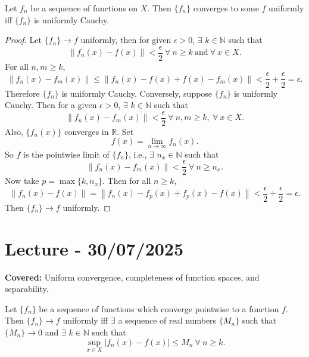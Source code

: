 \documentclass{functionspaces}
\begin{document}
\begin{proposition}
Let $f_{n}$ be a sequence of functions on $X$. Then $\{f_{n}\}$ converges to some $f$ uniformly iff $\{f_{n}\}$ is uniformly Cauchy.
\end{proposition}

\begin{proof}
Let $\{f_{n}\}\to f$ uniformly, then for given $\epsilon>0$, $\exists$ $k \in \mathbb{N}$ such that
\[
\|f_{n}(x)-f(x)\|<\frac{\epsilon}{2}\ \forall\ n \geq k\ \text{and}\ \forall\ x \in X.
\]
For all $n,m \geq k$,
\[
\|f_{n}(x)-f_{m}(x)\|\leq \|f_{n}(x)-f(x)+f(x)-f_{m}(x)\|<\frac{\epsilon}{2}+\frac{\epsilon}{2}=\epsilon.
\]
Therefore $\{f_{n}\}$ is uniformly Cauchy. Conversely, suppose $\{f_{n}\}$ is uniformly Cauchy. Then for a given $\epsilon>0$, $\exists$ $k \in \mathbb{N}$ such that
\[
\|f_{n}(x)-f_{m}(x)\|<\frac{\epsilon}{2}\ \forall\ n,m \geq k,\ \forall\ x \in X.
\]
Also, $\{f_{n}(x)\}$ converges in $\mathbb{R}$. Set
\[
f(x)=\lim_{n\to \infty}f_{n}(x).
\]
So $f$ is the pointwise limit of $\{f_{n}\}$, i.e., $\exists$ $n_{x} \in \mathbb{N}$ such that
\[
\|f_{n}(x)-f_{m}(x)\|<\frac{\epsilon}{2}\ \forall\ n \geq n_{x}.
\]
Now take $p=\max\{k,n_{x}\}$. Then for all $n \geq k$,
\[
\|f_{n}(x)-f(x)\|=\left\|f_{n}(x)-f_{p}(x)+f_{p}(x)-f(x)\right\|<\frac{\epsilon}{2}+\frac{\epsilon}{2}=\epsilon.
\]
Then $\{f_{n}\}\to f$ uniformly.
\end{proof}

\endgroup


\newpage
\section{Lecture - 30/07/2025}

\textbf{Covered:} Uniform convergence, completeness of function spaces, and separability.

\begingroup
\setlength{\parskip}{6pt}
\setlength{\parindent}{0pt}

\begin{proposition}
Let $\{f_{n}\}$ be a sequence of functions which converge pointwise to a function $f$. Then $\{f_{n}\}\to f$ uniformly iff $\exists$ a sequence of real numbers $\{M_{n}\}$ such that $\{M_{n}\}\to 0$ and $\exists$ $k\in\mathbb{N}$ such that
\[
\sup_{x\in X}|f_{n}(x)-f(x)|\leq M_{n}\ \forall\ n\geq k.
\]
\end{proposition}
\end{document}
